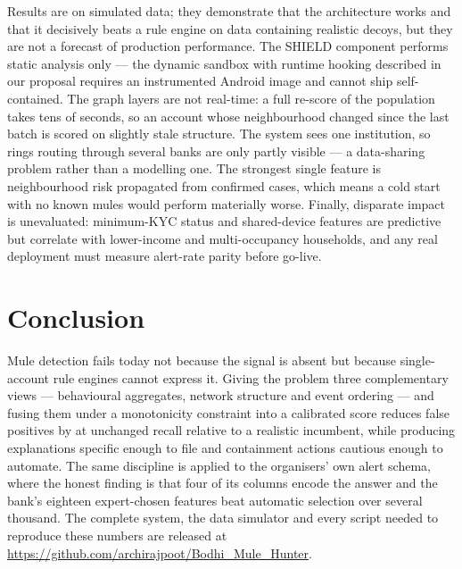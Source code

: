 \documentclass{article}
\begin{document}
Results are on simulated data; they demonstrate that the architecture works and
that it decisively beats a rule engine on data containing realistic decoys, but
they are not a forecast of production performance. The SHIELD component performs
static analysis only --- the dynamic sandbox with runtime hooking described in
our proposal requires an instrumented Android image and cannot ship
self-contained. The graph layers are not real-time: a full re-score of the
population takes tens of seconds, so an account whose neighbourhood changed
since the last batch is scored on slightly stale structure. The system sees one
institution, so rings routing through several banks are only partly visible ---
a data-sharing problem rather than a modelling one. The strongest single feature
is neighbourhood risk propagated from confirmed cases, which means a cold start
with no known mules would perform materially worse. Finally, disparate impact is
unevaluated: minimum-KYC status and shared-device features are predictive but
correlate with lower-income and multi-occupancy households, and any real
deployment must measure alert-rate parity before go-live.

\section{Conclusion}
\label{sec:conclusion}

Mule detection fails today not because the signal is absent but because
single-account rule engines cannot express it. Giving the problem three
complementary views --- behavioural aggregates, network structure and event
ordering --- and fusing them under a monotonicity constraint into a calibrated
score reduces false positives by \fpReduction{} at unchanged recall relative to
a realistic incumbent, while producing explanations specific enough to file and
containment actions cautious enough to automate. The same discipline is applied
to the organisers' own alert schema, where the honest finding is that four of its
columns encode the answer and the bank's eighteen expert-chosen features beat
automatic selection over several thousand. The complete system, the data
simulator and every script needed to reproduce these numbers are released at
\url{https://github.com/archirajpoot/Bodhi_Mule_Hunter}.

\vfill\pagebreak



\end{document}
